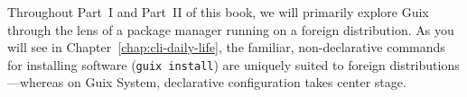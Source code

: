 Throughout Part~I and Part~II of this book, we will primarily explore Guix through the lens of a package manager running on a foreign distribution. As you will see in Chapter~\ref{chap:cli-daily-life}, the familiar, non-declarative commands for installing software (\texttt{guix install}) are uniquely suited to foreign distributions---whereas on Guix System, declarative configuration takes center stage.


